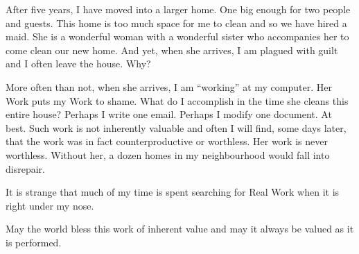 \documentclass{article}
\begin{document}
After five years, I have moved into a larger home. One big enough for two people and guests. This home is too much space for me to clean and so we have hired a maid. She is a wonderful woman with a wonderful sister who accompanies her to come clean our new home. And yet, when she arrives, I am plagued with guilt and I often leave the house. Why?

More often than not, when she arrives, I am ``working'' at my computer. Her Work puts my Work to shame. What do I accomplish in the time she cleans this entire house? Perhaps I write one email. Perhaps I modify one document. At best. Such work is not inherently valuable and often I will find, some days later, that the work was in fact counterproductive or worthless. Her work is never worthless. Without her, a dozen homes in my neighbourhood would fall into disrepair.

It is strange that much of my time is spent searching for Real Work when it is right under my nose.

May the world bless this work of inherent value and may it always be valued as it is performed.
\end{document}
